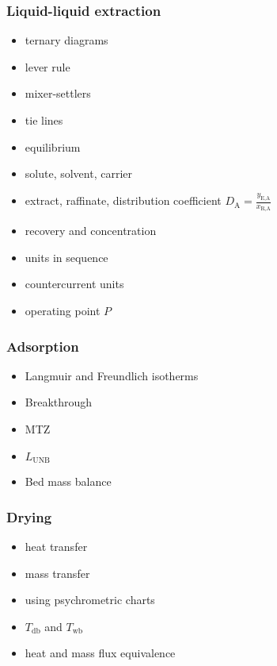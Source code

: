 {
\begin{frame}\frametitle{Liquid-liquid extraction {}}
	{}
	\begin{itemize}
		\item	ternary diagrams
		\item	lever rule
		\item	mixer-settlers
		\item	tie lines
		\item	equilibrium
		\item	solute, solvent, carrier
		\item	extract, raffinate, distribution coefficient $D_\text{A} = \displaystyle \frac{y_\text{E,A}}{x_\text{R,A}}$
		\item	recovery and concentration
		\item	units in sequence
		\item	countercurrent units
		\item	operating point $P$
	\end{itemize}
\end{frame}}

{
\begin{frame}\frametitle{Adsorption {}}
	\begin{itemize}
		\item	Langmuir and Freundlich isotherms
		\item	Breakthrough
		\item	MTZ
		\item	$L_\text{UNB}$
		\item	Bed mass balance
	\end{itemize}
\end{frame}}

{
\begin{frame}\frametitle{Drying {}}
	\begin{itemize}
		\item	heat transfer
		\item	mass transfer
		\item	using psychrometric charts
		\item	$T_\text{db}$ and $T_\text{wb}$
		\item	heat and mass flux equivalence
	\end{itemize}
\end{frame}}

